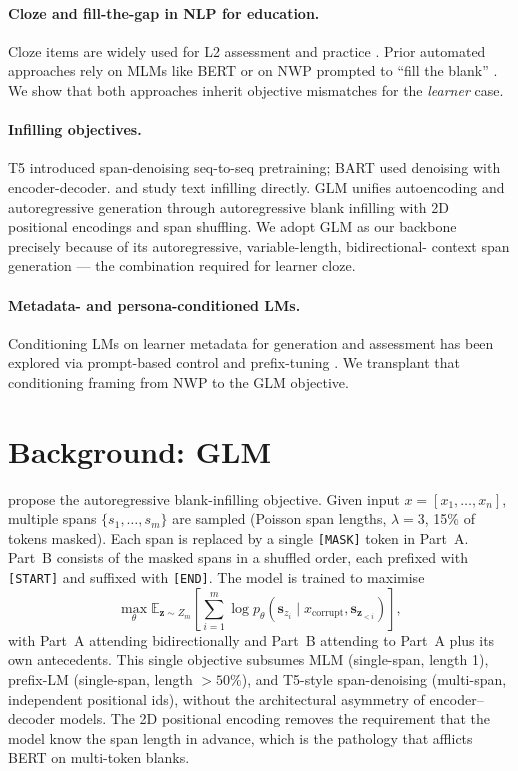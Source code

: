 \documentclass[11pt]{article}
\begin{document}
\paragraph{Cloze and fill-the-gap in NLP for education.}
Cloze items are widely used for L2 assessment and practice
\citep{taylor1953cloze}. Prior automated approaches rely on MLMs like BERT
\citep{devlin2019bert} or on NWP prompted to ``fill the blank''
\citep{panda2022automatic,kurdi2020systematic}. We show that both
approaches inherit objective mismatches for the \emph{learner} case.

\paragraph{Infilling objectives.}
T5 \citep{raffel2020exploring} introduced span-denoising seq-to-seq
pretraining; BART \citep{lewis2020bart} used denoising with
encoder-decoder. \citet{donahue2020enabling} and \citet{shen2020blank}
study text infilling directly. GLM \citep{du2022glm} unifies autoencoding
and autoregressive generation through autoregressive blank infilling with
2D positional encodings and span shuffling. We adopt GLM as our backbone
precisely because of its autoregressive, variable-length, bidirectional-
context span generation --- the combination required for learner cloze.

\paragraph{Metadata- and persona-conditioned LMs.}
Conditioning LMs on learner metadata for generation and assessment has
been explored via prompt-based control and prefix-tuning
\citep[our sibling sketch]{anonymous2026metadata}. We transplant that
conditioning framing from NWP to the GLM objective.

\section{Background: GLM}
\label{sec:background}

\citet{du2022glm} propose the autoregressive blank-infilling objective.
Given input $x = [x_1, \dots, x_n]$, multiple spans $\{s_1, \dots, s_m\}$
are sampled (Poisson span lengths, $\lambda{=}3$, 15\% of tokens masked).
Each span is replaced by a single \texttt{[MASK]} token in Part~A. Part~B
consists of the masked spans in a shuffled order, each prefixed with
\texttt{[START]} and suffixed with \texttt{[END]}. The model is trained to
maximise
\[
\max_\theta \mathbb{E}_{\mathbf{z} \sim Z_m}
\left[
\sum_{i=1}^{m} \log p_\theta(\mathbf{s}_{z_i}\mid x_{\text{corrupt}}, \mathbf{s}_{\mathbf{z}_{<i}})
\right],
\]
with Part~A attending bidirectionally and Part~B attending to Part~A plus
its own antecedents. This single objective subsumes MLM (single-span,
length 1), prefix-LM (single-span, length $>50\%$), and T5-style
span-denoising (multi-span, independent positional ids), without the
architectural asymmetry of encoder--decoder models. The 2D positional
encoding removes the requirement that the model know the span length
in advance, which is the pathology that afflicts BERT on multi-token
blanks.
\end{document}
